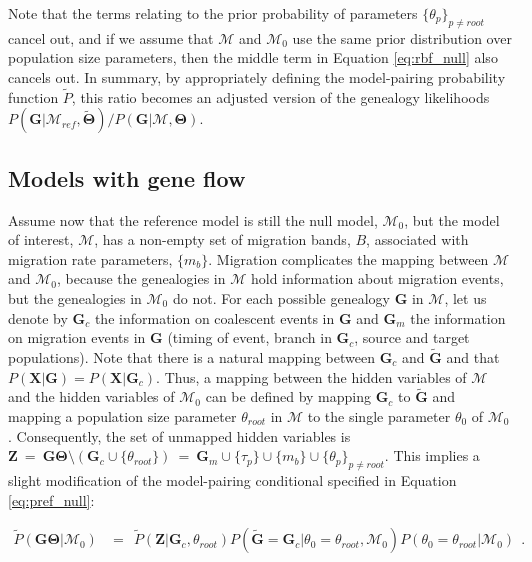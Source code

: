\documentclass[11pt]{article}
\newcommand{\vect}[1]{\boldsymbol{\mathbf{#1}}}
\newcommand{\X}{\vect{X}}
\newcommand{\M}{\mathcal{M}}
\newcommand{\G}{\vect{G}}
\newcommand{\T}{\vect{\Theta}}
\newcommand{\GT}{\G\T}
\newcommand{\Mref}{\M_{ref}}
\newcommand{\Pref}{\widetilde{P}}
\newcommand{\Gref}{\widetilde{\G}}
\newcommand{\Tref}{\widetilde{\T}}
\newcommand{\Z}{\vect{Z}}
\newcommand{\troot}{\theta_{root}}
\newcommand{\Gc}{\G_c}
\newcommand{\Gm}{\G_m}
\begin{document}
Note that the terms relating to the prior probability of parameters $\{\theta_p\}_{p\neq root}$ cancel out,
and  if we assume that $\M$ and $\M_0$ use the same prior distribution over population size parameters,
then the middle term in Equation \ref{eq:rbf_null} also cancels out.
%
In summary, by appropriately defining the model-pairing probability function $\Pref$, this ratio
becomes an adjusted version of the genealogy likelihoods $P(\G|\Mref,\Tref)/P(\G|\M,\T)$. 



\subsection*{Models with gene flow}

Assume now that the reference model is still the null model, $\M_0$, but the model of interest, $\M$, has a non-empty
set of migration bands, $B$, associated with migration rate parameters, $\{m_b\}$.
%
Migration complicates the mapping between $\M$ and $\M_0$, because the genealogies in $\M$ hold information
about migration events, but the genealogies in $\M_0$ do not.
%
For each possible genealogy $\G$ in $\M$, let us denote by $\Gc$ the information on coalescent events in $\G$
and $\Gm$ the information on migration events in $\G$ (timing of event, branch in $\Gc$, source and target populations).
%
Note that there is a natural mapping between $\Gc$ and $\Gref$ and that $P(\X|\G) = P(\X|\Gc)$.
Thus, a mapping between the hidden variables of $\M$ and the hidden variables of $\M_0$ can be defined by
mapping $\Gc$ to $\Gref$ and mapping a population size parameter $\troot$ in $\M$ to the single parameter $\theta_0$
of $\M_0$.
%
Consequently, the set of unmapped hidden variables is $\Z~=~\GT\setminus(\Gc\cup\{\troot\})~=~ \Gm\cup\{\tau_p\}\cup\{m_b\}\cup\{\theta_p\}_{p\neq root}$.
%
This implies a slight modification of the model-pairing conditional specified in Equation \ref{eq:pref_null}:
%
%
\begin{small}
\begin{align}
 \Pref(\GT|\M_0)
 &=~~ 
 \Pref(\Z|\Gc,\troot) P(\Gref=\Gc|\theta_0=\troot,\M_0) P(\theta_0=\troot|\M_0)\ ~ .\label{eq:pref_mig}
\end{align}
\end{small}
\end{document}
